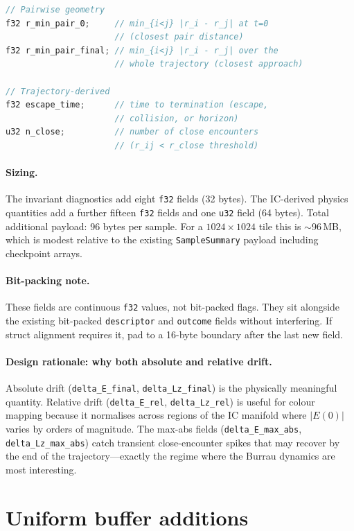 \documentclass[11pt]{article}
\newcommand{\field}[1]{\texttt{#1}}
\newcommand{\struct}[1]{\texttt{#1}}
\begin{document}
\begin{lstlisting}[language=C]
// Pairwise geometry
f32 r_min_pair_0;     // min_{i<j} |r_i - r_j| at t=0
                      // (closest pair distance)
f32 r_min_pair_final; // min_{i<j} |r_i - r_j| over the
                      // whole trajectory (closest approach)

// Trajectory-derived
f32 escape_time;      // time to termination (escape,
                      // collision, or horizon)
u32 n_close;          // number of close encounters
                      // (r_ij < r_close threshold)
\end{lstlisting}

\paragraph{Sizing.} The invariant diagnostics add eight \texttt{f32} fields
(32 bytes). The IC-derived physics quantities add a further fifteen \texttt{f32}
fields and one \texttt{u32} field (64 bytes). Total additional payload: 96 bytes
per sample. For a $1024 \times 1024$ tile this is $\sim$96\,MB, which is modest
relative to the existing \struct{SampleSummary} payload including checkpoint
arrays.

\paragraph{Bit-packing note.} These fields are continuous \texttt{f32} values,
not bit-packed flags. They sit alongside the existing bit-packed
\field{descriptor} and \field{outcome} fields without interfering. If struct
alignment requires it, pad to a 16-byte boundary after the last new field.

\paragraph{Design rationale: why both absolute and relative drift.}
Absolute drift (\field{delta\_E\_final}, \field{delta\_Lz\_final}) is the
physically meaningful quantity. Relative drift (\field{delta\_E\_rel},
\field{delta\_Lz\_rel}) is useful for colour mapping because it normalises
across regions of the IC manifold where $|E(0)|$ varies by orders of magnitude.
The max-abs fields (\field{delta\_E\_max\_abs}, \field{delta\_Lz\_max\_abs})
catch transient close-encounter spikes that may recover by the end of the
trajectory---exactly the regime where the Burrau dynamics are most interesting.

\section{Uniform buffer additions}
\label{sec:uniforms}
\end{document}
